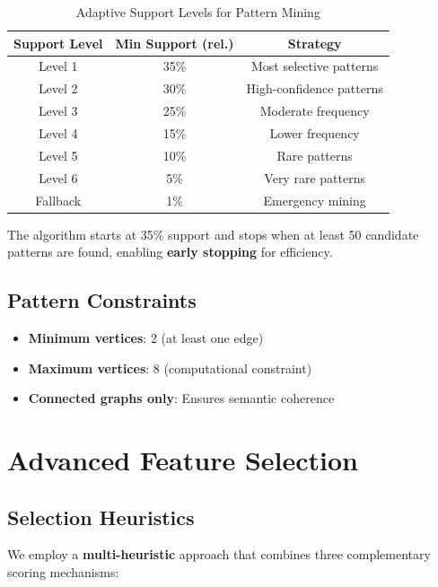 \documentclass[12pt,a4paper]{article}
\begin{document}
\begin{table}[H]
\centering
\begin{tabular}{ccc}
\toprule
\textbf{Support Level} & \textbf{Min Support (rel.)} & \textbf{Strategy} \\
\midrule
Level 1 & 35\% & Most selective patterns \\
Level 2 & 30\% & High-confidence patterns \\
Level 3 & 25\% & Moderate frequency \\
Level 4 & 15\% & Lower frequency \\
Level 5 & 10\% & Rare patterns \\
Level 6 & 5\% & Very rare patterns \\
Fallback & 1\% & Emergency mining \\
\bottomrule
\end{tabular}
\caption{Adaptive Support Levels for Pattern Mining}
\end{table}

The algorithm starts at 35\% support and stops when at least 50 candidate patterns are found, enabling \textbf{early stopping} for efficiency.

\subsection{Pattern Constraints}

\begin{itemize}
    \item \textbf{Minimum vertices}: 2 (at least one edge)
    \item \textbf{Maximum vertices}: 8 (computational constraint)
    \item \textbf{Connected graphs only}: Ensures semantic coherence
\end{itemize}

\section{Advanced Feature Selection}

\subsection{Selection Heuristics}

We employ a \textbf{multi-heuristic} approach that combines three complementary scoring mechanisms:
\end{document}
